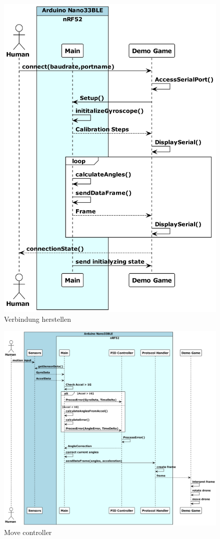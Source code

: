 \begin{figure}[H]
  \begin{center}
    \includegraphics[width=0.7\linewidth]{content/diagrams/out/sequence/connect.png}
    \caption{Verbindung herstellen}
  \end{center}
\end{figure}

\begin{figure}[H]
  \begin{center}
    \includegraphics[width=1\linewidth]{content/diagrams/out/sequence/moveController.png}
    \caption{Move controller}
  \end{center}
\end{figure}

